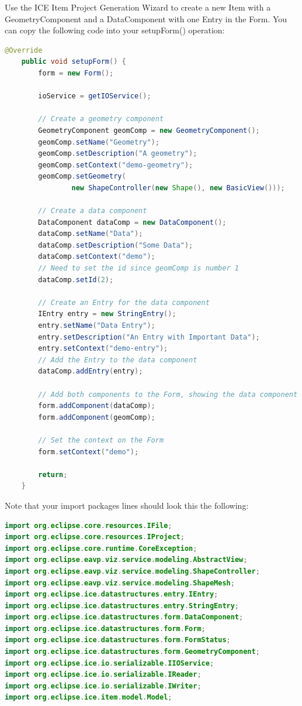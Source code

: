 Use the ICE Item Project Generation Wizard to create a new Item with  a
GeometryComponent and a DataComponent with one Entry in the Form. You can copy
the following code into your setupForm() operation:

\begin{lstlisting}[language=java]
@Override
    public void setupForm() {
		form = new Form();

		ioService = getIOService();

		// Create a geometry component
		GeometryComponent geomComp = new GeometryComponent();
		geomComp.setName("Geometry");
		geomComp.setDescription("A geometry");
		geomComp.setContext("demo-geometry");
		geomComp.setGeometry(
				new ShapeController(new Shape(), new BasicView()));

		// Create a data component
		DataComponent dataComp = new DataComponent();
		dataComp.setName("Data");
		dataComp.setDescription("Some Data");
		dataComp.setContext("demo");
		// Need to set the id since geomComp is number 1
		dataComp.setId(2);

		// Create an Entry for the data component
		IEntry entry = new StringEntry();
		entry.setName("Data Entry");
		entry.setDescription("An Entry with Important Data");
		entry.setContext("demo-entry");
		// Add the Entry to the data component
		dataComp.addEntry(entry);

		// Add both components to the Form, showing the data component first.
		form.addComponent(dataComp);
		form.addComponent(geomComp);

		// Set the context on the Form
		form.setContext("demo");

		return;
    }
\end{lstlisting}

Note that your import packages lines should look this the following:

\begin{lstlisting}[language=java]
import org.eclipse.core.resources.IFile;
import org.eclipse.core.resources.IProject;
import org.eclipse.core.runtime.CoreException;
import org.eclipse.eavp.viz.service.modeling.AbstractView;
import org.eclipse.eavp.viz.service.modeling.ShapeController;
import org.eclipse.eavp.viz.service.modeling.ShapeMesh;
import org.eclipse.ice.datastructures.entry.IEntry;
import org.eclipse.ice.datastructures.entry.StringEntry;
import org.eclipse.ice.datastructures.form.DataComponent;
import org.eclipse.ice.datastructures.form.Form;
import org.eclipse.ice.datastructures.form.FormStatus;
import org.eclipse.ice.datastructures.form.GeometryComponent;
import org.eclipse.ice.io.serializable.IIOService;
import org.eclipse.ice.io.serializable.IReader;
import org.eclipse.ice.io.serializable.IWriter;
import org.eclipse.ice.item.model.Model;
\end{lstlisting}

